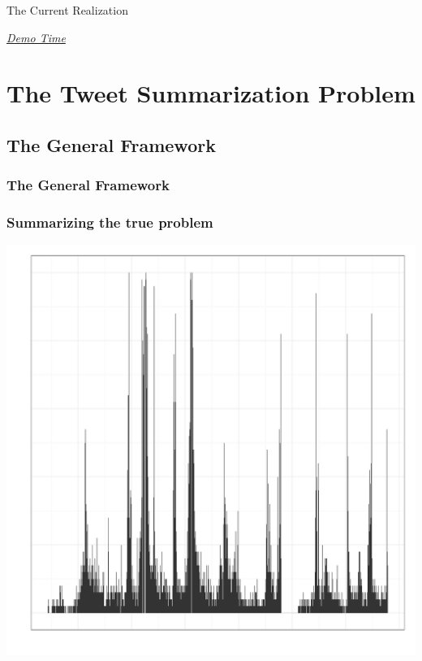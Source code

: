 \documentclass[compress]{beamer}
\begin{document}
\begin{frame}{The Current Realization}

\href{http://fozziethebeat.github.com/tweetolympics/}{\textit{Demo Time}}

\end{frame}

\section{The Tweet Summarization Problem}

\subsection{The General Framework}

\begin{frame}
\frametitle<1>{The General Framework}
\frametitle<2->{Summarizing the true problem}

\includegraphics[width=\textwidth,height=.50\textheight]{tweet-archery-example.pdf}

\begin{overlayarea}{\textwidth}{3.3cm}


\end{overlayarea}
\end{frame}
\end{document}

